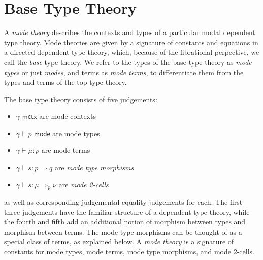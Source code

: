 \documentclass[10pt]{article}
\theoremstyle{definition}
\newcommand{\yields}{\vdash}
\newcommand{\tcell}{\Rightarrow}
\newcommand{\ctx}{\,\,\mathsf{mctx}}
\newcommand{\type}{\,\,\mathsf{mode}}
\newcommand\TypeTwo[4]{\ensuremath{#1 \vdash #2 :  #3 \tcell #4}}
\newcommand\TermTwoT[5]{\ensuremath{#1 \vdash {#2} : #3 \tcell_{#5} #4}}
\begin{document}






\section{Base Type Theory}
\label{sec:base-syntax}

A \emph{mode theory} describes the contexts and types of a particular
modal dependent type theory.  Mode theories are given by a signature of
constants and equations in a directed dependent type theory, which,
because of the fibrational perpective, we call the \emph{base} type
theory.  We refer to the types of the base type theory as \emph{mode
  types} or just \emph{modes}, and terms as \emph{mode terms}, to
differentiate them from the types and terms of the top type theory.

The base type theory consists of five judgements:
\begin{itemize}
\item $\gamma \ctx$ are mode contexts
\item $\gamma \yields p \type$ are mode types
\item $\gamma \yields \mu : p$ are mode terms
\item $\TypeTwo{\gamma}{s}{p}{q}$ are \emph{mode type morphisms}
\item $\TermTwoT{\gamma}{s}{\mu}{\nu}{p}$ are \emph{mode 2-cells}
\end{itemize}
as well as corresponding judgemental equality judgements for each.
The first three judgements have the familiar structure of a dependent
type theory, while the fourth and fifth add an additional notion of
morphism between types and morphism between terms.  The mode type
morphisms can be thought of as a special class of terms, as explained
below.  A \emph{mode theory} is a signature of constants for mode types,
mode terms, mode type morphisms, and mode 2-cells.
\end{document}
